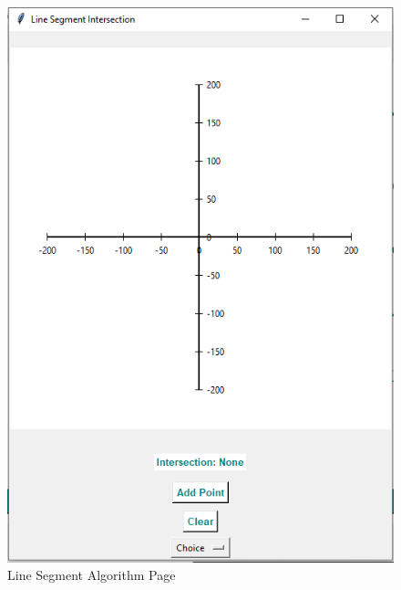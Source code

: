 \begin{figure}
    \centering
    \includegraphics[width=1\linewidth]{p3.PNG}
    \caption{Line Segment Algorithm Page}
    \label{fig:enter-label}
\end{figure}

